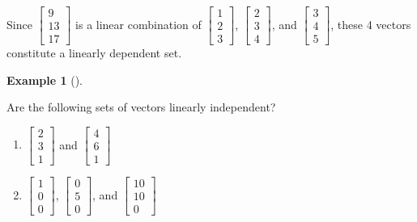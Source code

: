 \documentclass[
  letterpaper,
]{book}
\providecommand{\tightlist}{%
  \setlength{\itemsep}{0pt}\setlength{\parskip}{0pt}}\usepackage{longtable,booktabs,array}
\theoremstyle{definition}
\theoremstyle{definition}
\newtheorem{example}{Example}[chapter]
\theoremstyle{plain}
\theoremstyle{definition}
\theoremstyle{plain}
\theoremstyle{plain}
\theoremstyle{remark}
\begin{document}
Since \(\begin{bmatrix}9 \\ 13 \\ 17 \end{bmatrix}\) is a linear
combination of \(\begin{bmatrix}1 \\ 2 \\ 3 \end{bmatrix}\),
\(\begin{bmatrix} 2 \\ 3\\ 4\end{bmatrix}\), and
\(\begin{bmatrix} 3 \\ 4 \\ 5 \end{bmatrix}\), these 4 vectors
constitute a linearly dependent set.

\leavevmode{}%
\begin{example}[]\label{exm-linearindep}

Are the following sets of vectors linearly independent?

\begin{enumerate}
\def\labelenumi{\arabic{enumi}.}
\tightlist
\item
  \(\begin{bmatrix}2 \\ 3 \\ 1 \end{bmatrix}\) and
  \(\begin{bmatrix}4 \\ 6 \\ 1 \end{bmatrix}\)
\item
  \(\begin{bmatrix}1 \\ 0 \\ 0 \end{bmatrix}\),
  \(\begin{bmatrix}0 \\ 5 \\ 0 \end{bmatrix}\), and
  \(\begin{bmatrix}10 \\ 10 \\ 0 \end{bmatrix}\)
\end{enumerate}

\end{example}
\end{document}
